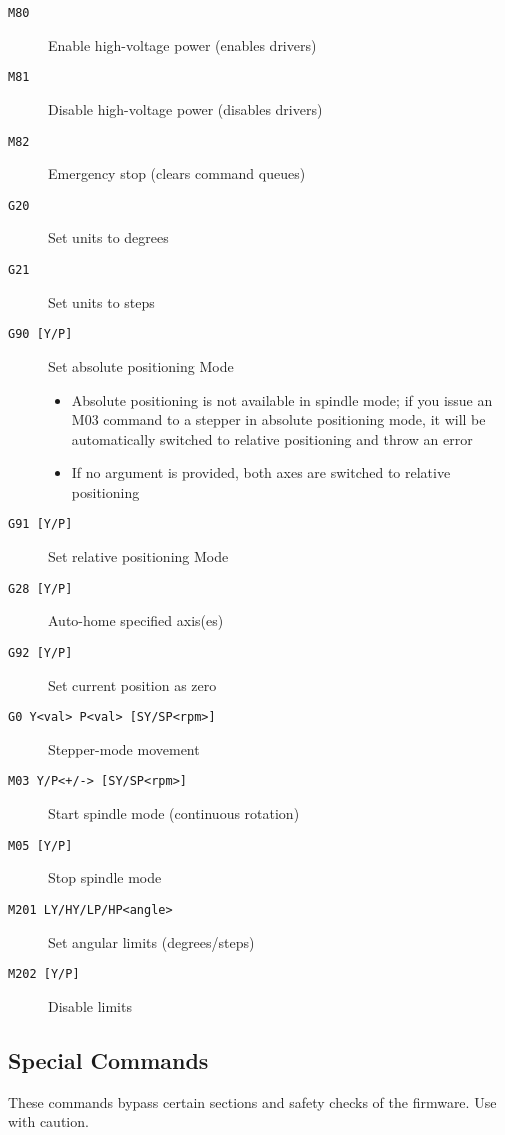 \begin{description}
  \item[\texttt{M80}] Enable high-voltage power (enables drivers)
  \item[\texttt{M81}] Disable high-voltage power (disables drivers)
  \item[\texttt{M82}] Emergency stop (clears command queues)
  \item[\texttt{G20}] Set units to degrees
  \item[\texttt{G21}] Set units to steps
  \item[\texttt{G90 [Y/P]}] Set absolute positioning Mode
    \begin{itemize}
      \item Absolute positioning is not available in spindle mode; if you issue an M03 command to a stepper in absolute positioning mode, it will be automatically switched to relative positioning and throw an error
      \item If no argument is provided, both axes are switched to relative positioning
    \end{itemize}
  \item[\texttt{G91 [Y/P]}] Set relative positioning Mode
  \item[\texttt{G28 [Y/P]}] Auto-home specified axis(es)
  \item[\texttt{G92 [Y/P]}] Set current position as zero
  \item[\texttt{G0 Y<val> P<val> [SY/SP<rpm>]}] Stepper-mode movement
  \item[\texttt{M03 Y/P<+/-> [SY/SP<rpm>]}] Start spindle mode (continuous rotation)
  \item[\texttt{M05 [Y/P]}] Stop spindle mode
  \item[\texttt{M201 LY/HY/LP/HP<angle>}] Set angular limits (degrees/steps)
  \item[\texttt{M202 [Y/P]}] Disable limits
\end{description}

\subsection*{Special Commands}

These commands bypass certain sections and safety checks of the firmware. Use with caution.

